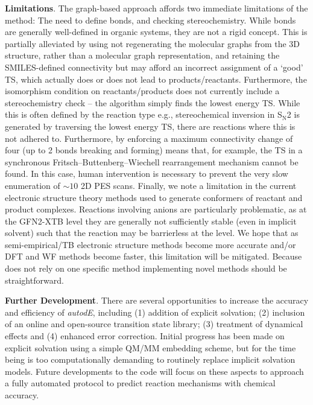 \documentclass[../../main.tex]{subfiles}
\begin{document}
{\bfseries{Limitations}}. The graph-based approach affords two immediate limitations of the method: The need to define bonds, and checking stereochemistry. While bonds are generally well-defined in organic systems, they are not a rigid concept. This is partially alleviated by using not regenerating the molecular graphs from the 3D structure, rather than a molecular graph representation, and retaining the SMILES-defined connectivity but may afford an incorrect assignment of a ‘good’ TS, which actually does or does not lead to products/reactants. Furthermore, the isomorphism condition on reactants/products does not currently include a stereochemistry check – the algorithm simply finds the lowest energy TS. While this is often defined by the reaction type e.g., stereochemical inversion in S$_\text{N}$2 is generated by traversing the lowest energy TS, there are reactions where this is not adhered to. Furthermore, by enforcing a maximum connectivity change of four (up to 2 bonds breaking and forming) means that, for example, the TS in a synchronous Fritsch–Buttenberg–Wiechell rearrangement mechanism cannot be found. In this case, human intervention is necessary to prevent the very slow enumeration of $\sim 10$ 2D PES scans. Finally, we note a limitation in the current \lmethodx electronic structure theory methods used to generate conformers of reactant and product complexes. Reactions involving anions are particularly problematic, as at the GFN2-XTB level they are generally not sufficiently stable (even in implicit solvent) such that the reaction may be barrierless at the \lmethodx level. We hope that as semi-empirical/TB electronic structure methods become more accurate and/or DFT and WF methods become faster, this limitation will be mitigated. Because \ade does not rely on one specific method implementing novel methods should be straightforward.

{\bfseries{Further Development}}. There are several opportunities to increase the accuracy and efficiency of \emph{autodE}, including (1) addition of explicit solvation; (2) inclusion of an online and open-source transition state library; (3) treatment of dynamical effects and (4) enhanced error correction. Initial progress has been made on explicit solvation using a simple QM/MM embedding scheme, but for the time being is too computationally demanding to routinely replace implicit solvation models. Future developments to the code will focus on these aspects to approach a fully automated protocol to predict reaction mechanisms with chemical accuracy.
\end{document}
